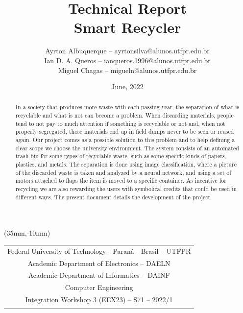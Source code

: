 \documentclass[a4paper,11pt]{article}
\title{
Technical Report\\
\textbf{Smart Recycler}}
\author{
Ayrton Albuquerque \footnotesize{-- ayrtonsilva@alunos.utfpr.edu.br}\\
Ian D. A. Queros \footnotesize{-- ianqueros.1996@alunos.utfpr.edu.br}\\
Miguel Chagas \footnotesize{-- migueln@alunos.utfpr.edu.br}\\
}
\date{June, 2022}
\begin{document}
\thisfancyput(35mm,-10mm){
  \begin{tabular}{c}
    Federal University of Technology - Paraná - Brasil -- \small{UTFPR} \\
    Academic Department of Electronics -- \small{DAELN}                 \\
    Academic Department of Informatics -- \small{DAINF}                 \\
    Computer Engineering                                                \\
    Integration Workshop 3 (EEX23) -- S71 -- 2022/1                     \\
    \\
    \hline
  \end{tabular}}

\maketitle

\begin{abstract}
  \noindent In a society that produces more waste with each passing year, the separation of what is recyclable and what is not can become a problem. When discarding materials, people tend to not pay to much attention if something is recyclable or not and, when not properly segregated, those materials end up in field dumps never to be seen or reused again. Our project comes as a possible solution to this problem and to help defining a clear scope we choose the university environment. The system consists of an automated trash bin for some types of recyclable waste, such as some specific kinds of papers, plastics, and metals. The separation is done using image classification, where a picture of the discarded waste is taken and analyzed by a neural network, and using a set of motors attached to flaps the item is moved to a specific container. As incentive for recycling we are also rewarding the users with symbolical credits that could be used in different ways. The present document details the development of the project.
\end{abstract}

\end{document}
